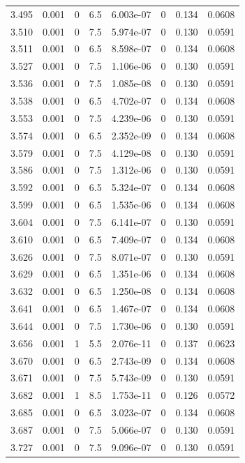\documentclass[preview]{standalone}
\begin{document}
{{{{{{{{{{\begin{tabular}{L{1.2cm}C{1.2cm} C{0.3cm}C{0.5cm} C{1.4cm}C{1.4cm} C{1.4cm}C{1.4cm}}
  3.495  &  0.001  & 0     & 6.5 &  6.003e-07  & 0  & 0.134 &  0.0608   \\ 
  3.510  &  0.001  & 0     & 7.5 &  5.974e-07  & 0  & 0.130 &  0.0591   \\ 
  3.511  &  0.001  & 0     & 6.5 &  8.598e-07  & 0  & 0.134 &  0.0608   \\ 
  3.527  &  0.001  & 0     & 7.5 &  1.106e-06  & 0  & 0.130 &  0.0591   \\ 
  3.536  &  0.001  & 0     & 7.5 &  1.085e-08  & 0  & 0.130 &  0.0591   \\ 
  3.538  &  0.001  & 0     & 6.5 &  4.702e-07  & 0  & 0.134 &  0.0608   \\ 
  3.553  &  0.001  & 0     & 7.5 &  4.239e-06  & 0  & 0.130 &  0.0591   \\ 
  3.574  &  0.001  & 0     & 6.5 &  2.352e-09  & 0  & 0.134 &  0.0608   \\ 
  3.579  &  0.001  & 0     & 7.5 &  4.129e-08  & 0  & 0.130 &  0.0591   \\ 
  3.586  &  0.001  & 0     & 7.5 &  1.312e-06  & 0  & 0.130 &  0.0591   \\ 
  3.592  &  0.001  & 0     & 6.5 &  5.324e-07  & 0  & 0.134 &  0.0608   \\ 
  3.599  &  0.001  & 0     & 6.5 &  1.535e-06  & 0  & 0.134 &  0.0608   \\ 
  3.604  &  0.001  & 0     & 7.5 &  6.141e-07  & 0  & 0.130 &  0.0591   \\ 
  3.610  &  0.001  & 0     & 6.5 &  7.409e-07  & 0  & 0.134 &  0.0608   \\ 
  3.626  &  0.001  & 0     & 7.5 &  8.071e-07  & 0  & 0.130 &  0.0591   \\ 
  3.629  &  0.001  & 0     & 6.5 &  1.351e-06  & 0  & 0.134 &  0.0608   \\ 
  3.632  &  0.001  & 0     & 6.5 &  1.250e-08  & 0  & 0.134 &  0.0608   \\ 
  3.641  &  0.001  & 0     & 6.5 &  1.467e-07  & 0  & 0.134 &  0.0608   \\ 
  3.644  &  0.001  & 0     & 7.5 &  1.730e-06  & 0  & 0.130 &  0.0591   \\ 
  3.656  &  0.001  & 1     & 5.5 &  2.076e-11  & 0  & 0.137 &  0.0623   \\ 
  3.670  &  0.001  & 0     & 6.5 &  2.743e-09  & 0  & 0.134 &  0.0608   \\ 
  3.671  &  0.001  & 0     & 7.5 &  5.743e-09  & 0  & 0.130 &  0.0591   \\ 
  3.682  &  0.001  & 1     & 8.5 &  1.753e-11  & 0  & 0.126 &  0.0572   \\ 
  3.685  &  0.001  & 0     & 6.5 &  3.023e-07  & 0  & 0.134 &  0.0608   \\ 
  3.687  &  0.001  & 0     & 7.5 &  5.066e-07  & 0  & 0.130 &  0.0591   \\ 
  3.727  &  0.001  & 0     & 7.5 &  9.096e-07  & 0  & 0.130 &  0.0591   \\ 
\hline 
\end{tabular} 

}}}}}}}}}}
\end{document}

